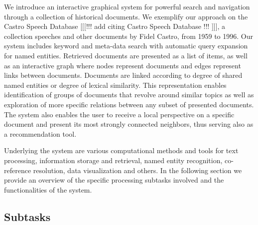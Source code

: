 We introduce an interactive graphical system for powerful search and navigation through a collection of historical documents. 
We exemplify our approach on the Castro Speech Database [[[!!! add citing Castro Speech Database !!! ]]], a collection 
speeches and other documents by Fidel Castro, from 1959 to 1996. Our system includes keyword and meta-data search with automatic query 
expansion for named entities. Retrieved documents are presented as a list of items, as well as an interactive graph where nodes represent 
documents and edges represent links between documents. Documents are linked according to degree of shared named entities or degree of lexical 
similarity. This representation enables identification of groups of documents that revolve around similar topics as well as exploration of 
more specific relations between any subset of presented documents. The system also enables the user to receive a local perspective on a 
specific document and present its most strongly connected neighbors, thus serving also as a recommendation tool. 

Underlying the system are various computational methods and tools for text processing, 
information storage and retrieval, named entity recognition, co-reference resolution, 
data visualization and others. In the following section we provide an overview of the specific processing subtasks 
involved and the functionalities of the system.

\subsection{Subtasks}
\label{sec:subtasks}
